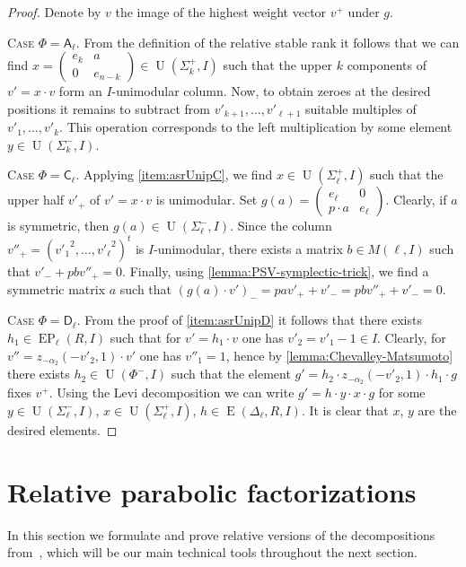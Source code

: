 \documentclass[11pt]{amsart}
\theoremstyle{plain}
\numberwithin{equation}{section}
\numberwithin{lemma}{section}
\theoremstyle{definition}
\theoremstyle{remark}
\DeclareMathOperator{\E}{E}
\DeclareMathOperator{\EP}{EP}
\DeclareMathOperator{\U}{U}
\newcommand{\rA}{\mathsf{A}}
\newcommand{\rC}{\mathsf{C}}
\newcommand{\rD}{\mathsf{D}}
\begin{document}
\begin{proof} Denote by $v$ the image of the highest weight vector $v^+$ under $g$.

\textsc{Case $\Phi=\rA_\ell$.} From the definition of the relative stable rank it follows that we can find 
$x= \left(\begin{smallmatrix} e_k & a \\ 0 & e_{n-k} \end{smallmatrix}\right) \in \U(\Sigma_k^+, I)$ such that 
the upper $k$ components of $v'= x \cdot v$ form an $I$-unimodular column. 
Now, to obtain zeroes at the desired positions it remains to subtract from $v'_{k+1},\ldots, v'_{\ell+1}$ suitable multiples of $v'_1, \ldots, v'_k$.
This operation corresponds to the left multiplication by some element $y\in\U(\Sigma_k^-, I)$.

\textsc{Case $\Phi=\rC_\ell$.} 
Applying \cref{item:asrUnipC}, we find $x \in \U(\Sigma_\ell^+, I)$ such that the upper half $v'_+$ of $v' = x \cdot v$ is unimodular.
Set $g(a) = \left(\begin{smallmatrix} e_\ell & 0 \\ p \cdot a & e_{\ell} \end{smallmatrix}\right)$.
Clearly, if $a$ is symmetric, then $g(a) \in \U(\Sigma_\ell^-, I)$.
Since the column $v''_+ = ({v'_1}^2, \ldots, {v'_\ell}^2)^t$ is $I$-unimodular, there exists a matrix $b \in M(\ell, I)$ such that $v'_- + p b v''_+ = 0$.
Finally, using \cref{lemma:PSV-symplectic-trick}, we find a symmetric matrix $a$ such that $(g(a) \cdot v')_- = p a v'_+ + v'_- = p b v''_+ + v'_- = 0$.

\textsc{Case $\Phi=\rD_\ell$.} From the proof of \cref{item:asrUnipD} it follows that there exists $h_1 \in \EP_\ell(R, I)$ such that for $v'=h_1\cdot v$ one has $v'_2=v'_1-1\in I$.
Clearly, for $v'' = z_{-\alpha_{2}}(-v'_2, 1)\cdot v'$ one has $v''_1=1$, hence by \cref{lemma:Chevalley-Matsumoto} there exists $h_2 \in \U(\Phi^-, I)$ such that the element
$g'=h_2 \cdot z_{-\alpha_{2}}(-v'_2, 1) \cdot h_1 \cdot g$ fixes $v^+$. 
Using the Levi decomposition we can write $g'=h \cdot y \cdot x \cdot g$ for some $y\in\U(\Sigma^-_\ell, I)$, $x \in \U(\Sigma^+_\ell, I)$, $h\in\E(\Delta_\ell, R, I)$.
It is clear that $x$, $y$ are the desired elements.
\end{proof}

\section{Relative parabolic factorizations} \label{sec:factorizations}
In this section we formulate and prove relative versions of the decompositions from~\cite{St78}, which will be our main technical tools throughout the next section.
\end{document}
